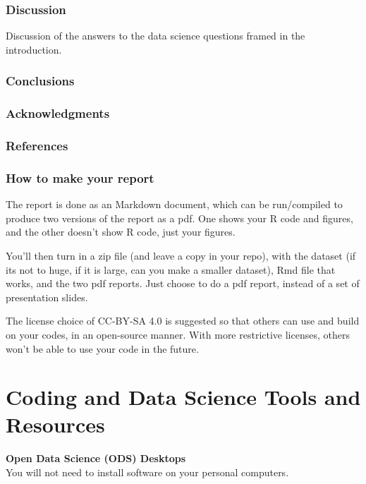 \documentclass[10pt]{article} %
\begin{document}
  \subsubsection{Discussion}
    Discussion of the answers to the data science questions framed in the introduction.

  \subsubsection{Conclusions}

  \subsubsection{Acknowledgments}

  \subsubsection{References}

  \subsubsection{How to make your report}

    The report is done as an Markdown document, which can be run/compiled to produce two versions of the report as a pdf.
    One shows your R code and figures, and the other doesn't show R code, just your figures.

    You'll then turn in a zip file (and leave a copy in your repo), with the dataset (if its not to huge, if it is large, can you make a smaller dataset), Rmd file that works, and the two pdf reports.
    Just choose to do a pdf report, instead of a set of presentation slides.

    The license choice of CC-BY-SA 4.0 is suggested so that others can use and build on your codes, in an open-source manner.
    With more restrictive licenses, others won't be able to use your code in the future.


\section{Coding and Data Science Tools and Resources}

  {\bf Open Data Science (ODS) Desktops} \\

  You will not need to install software on your personal computers.
\end{document}
